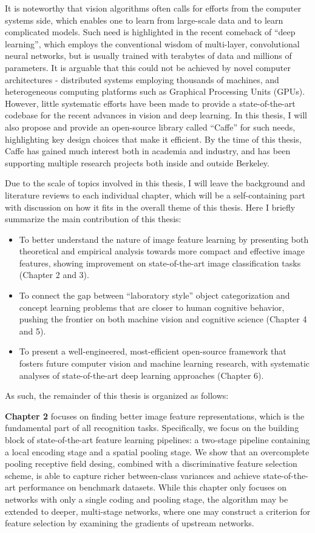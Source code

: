 It is noteworthy that vision algorithms often calls for efforts from the computer systems side, which enables one to learn from large-scale data and to learn complicated models. Such need is highlighted in the recent comeback of ``deep learning'', which employs the conventional wisdom of multi-layer, convolutional neural networks, but is usually trained with terabytes of data and millions of parameters. It is arguable that this could not be achieved by novel computer architectures - distributed systems employing thousands of machines, and heterogeneous computing platforms such as Graphical Processing Units (GPUs). However, little systematic efforts have been made to provide a state-of-the-art codebase for the recent advances in vision and deep learning. In this thesis, I will also propose and provide an open-source library called ``Caffe'' for such needs, highlighting key design choices that make it efficient. By the time of this thesis, Caffe has gained much interest both in academia and industry, and has been supporting multiple research projects both inside and outside Berkeley.

Due to the scale of topics involved in this thesis, I will leave the background and literature reviews to each individual chapter, which will be a self-containing part with discussion on how it fits in the overall theme of this thesis. Here I briefly summarize the main contribution of this thesis:
\begin{itemize}
    \item To better understand the nature of image feature learning by presenting both theoretical and empirical analysis towards more compact and effective image features, showing improvement on state-of-the-art image classification tasks (Chapter 2 and 3).
    \item To connect the gap between ``laboratory style'' object categorization and concept learning problems that are closer to human cognitive behavior, pushing the frontier on both machine vision and cognitive science (Chapter 4 and 5).
    \item To present a well-engineered, most-efficient open-source framework that fosters future computer vision and machine learning research, with systematic analyses of state-of-the-art deep learning approaches (Chapter 6).
\end{itemize}

As such, the remainder of this thesis is organized as follows:

{\bfseries Chapter 2} focuses on finding better image feature representations, which is the fundamental part of all recognition tasks. Specifically, we focus on the building block of state-of-the-art feature learning pipelines: a two-stage pipeline containing a local encoding stage and a spatial pooling stage. We show that an overcomplete pooling receptive field desing, combined with a discriminative feature selection scheme, is able to capture richer between-class variances and achieve state-of-the-art performance on benchmark datasets. While this chapter only focuses on networks with only a single coding and pooling stage, the algorithm may be extended to deeper, multi-stage networks, where one may construct a criterion for feature selection by examining the gradients of upstream networks.

